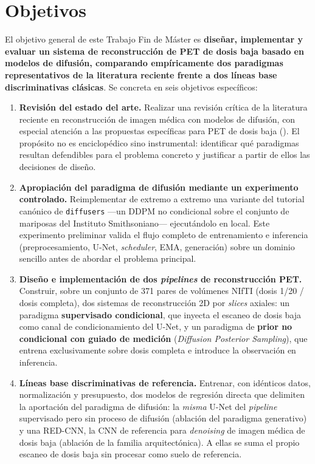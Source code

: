\section{Objetivos}
\label{sec:objetivos}

El objetivo general de este Trabajo Fin de Máster es \textbf{diseñar,
implementar y evaluar un sistema de reconstrucción de PET de dosis
baja basado en modelos de difusión, comparando empíricamente dos
paradigmas representativos de la literatura reciente frente a dos
líneas base discriminativas clásicas}. Se concreta en seis objetivos
específicos:

\begin{enumerate}[leftmargin=*]
    \item \textbf{Revisión del estado del arte.} Realizar una
    revisión crítica de la literatura reciente en reconstrucción
    de imagen médica con modelos de difusión, con especial atención
    a las propuestas específicas para PET de dosis baja
    (). El propósito no es enciclopédico
    sino instrumental: identificar qué paradigmas resultan
    defendibles para el problema concreto y justificar a partir de
    ellos las decisiones de diseño.

    \item \textbf{Apropiación del paradigma de difusión mediante un
    experimento controlado.} Reimplementar de extremo a extremo una
    variante del tutorial canónico de \texttt{diffusers} —un DDPM no
    condicional sobre el conjunto de mariposas del Instituto
    Smithsoniano— ejecutándolo en local. Este experimento preliminar
    valida el flujo completo de entrenamiento e inferencia
    (preprocesamiento, U-Net, \textit{scheduler}, EMA, generación)
    sobre un dominio sencillo antes de abordar el problema principal.

    \item \textbf{Diseño e implementación de dos \textit{pipelines}
    de reconstrucción PET.} Construir, sobre un conjunto de 371
    pares de volúmenes NIfTI (dosis 1/20 / dosis completa), dos
    sistemas de reconstrucción 2D por \textit{slices} axiales: un
    paradigma \textbf{supervisado condicional}, que inyecta el
    escaneo de dosis baja como canal de condicionamiento del U-Net,
    y un paradigma de \textbf{prior no condicional con guiado de
    medición} (\textit{Diffusion Posterior Sampling}), que entrena
    exclusivamente sobre dosis completa e introduce la observación
    en inferencia.

    \item \textbf{Líneas base discriminativas de referencia.}
    Entrenar, con idénticos datos, normalización y presupuesto, dos
    modelos de regresión directa que delimiten la aportación del
    paradigma de difusión: la \emph{misma} U-Net del
    \textit{pipeline} supervisado pero sin proceso de difusión
    (ablación del paradigma generativo) y una RED-CNN, la CNN de
    referencia para \textit{denoising} de imagen médica de dosis
    baja (ablación de la familia arquitectónica). A ellas se suma el
    propio escaneo de dosis baja sin procesar como suelo de
    referencia.


\end{enumerate}
